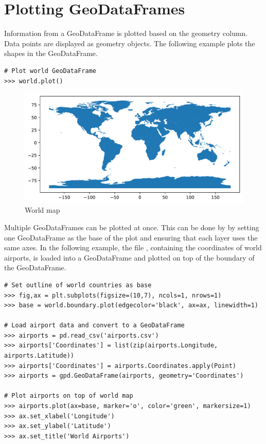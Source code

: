 \section*{Plotting GeoDataFrames} %

Information from a GeoDataFrame is plotted based on the geometry column.
Data points are displayed as geometry objects.
The following example plots the shapes in the  GeoDataFrame.

\begin{lstlisting}
# Plot world GeoDataFrame
>>> world.plot()
\end{lstlisting}

\begin{figure}[H]
\begin{center}
\includegraphics[scale=.55]{figures/worldmap.pdf}
\end{center}
\label{world-map}
\caption{World map}
\end{figure}

Multiple GeoDataFrames can be plotted at once.
This can be done by by setting one GeoDataFrame as the base of the plot and ensuring that each layer uses the same axes.
In the following example, the file , containing the coordinates of world airports, is loaded into a GeoDataFrame and plotted on top of the boundary of the  GeoDataFrame.

\begin{lstlisting}
# Set outline of world countries as base
>>> fig,ax = plt.subplots(figsize=(10,7), ncols=1, nrows=1)
>>> base = world.boundary.plot(edgecolor='black', ax=ax, linewidth=1)

# Load airport data and convert to a GeoDataFrame
>>> airports = pd.read_csv('airports.csv')
>>> airports['Coordinates'] = list(zip(airports.Longitude, airports.Latitude))
>>> airports['Coordinates'] = airports.Coordinates.apply(Point)
>>> airports = gpd.GeoDataFrame(airports, geometry='Coordinates')

# Plot airports on top of world map
>>> airports.plot(ax=base, marker='o', color='green', markersize=1)
>>> ax.set_xlabel('Longitude')
>>> ax.set_ylabel('Latitude')
>>> ax.set_title('World Airports')
\end{lstlisting}


